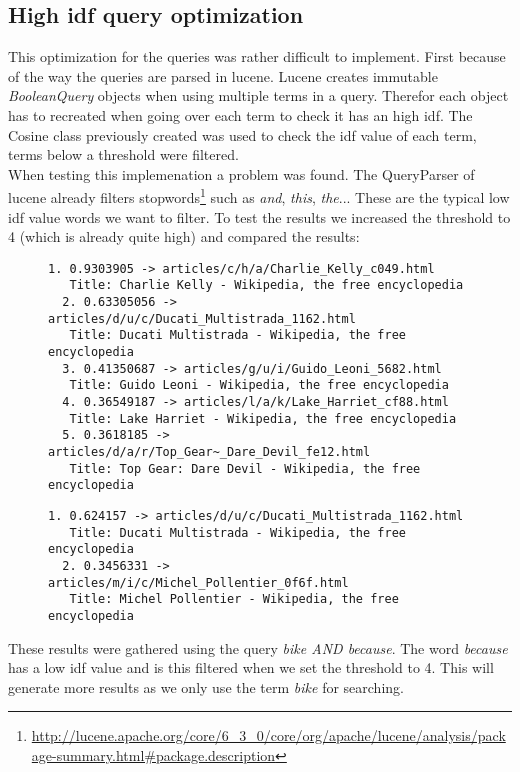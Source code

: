 \documentclass{article}
\begin{document}
\subsection{High idf query optimization}
This optimization for the queries was rather difficult to implement. First because of the way the queries are parsed in lucene. Lucene creates immutable \emph{BooleanQuery} objects when using multiple terms in a query. Therefor each object has to recreated when going over each term to check it has an high idf. The Cosine class previously created was used to check the idf value of each term, terms below a threshold were filtered.\\
When testing this implemenation a problem was found. The QueryParser of lucene already filters stopwords\footnote{\url{http://lucene.apache.org/core/6_3_0/core/org/apache/lucene/analysis/package-summary.html#package.description}} such as \emph{and}, \emph{this}, \emph{the}... These are the typical low idf value words we want to filter. To test the results we increased the threshold to 4 (which is already quite high) and compared the results:\\
\begin{figure}[H]
	\begin{minipage}{0.5\textwidth}
		\centering
		\begin{lstlisting}[basicstyle=\tiny\ttfamily, caption={High threshold}]
  1. 0.9303905 -> articles/c/h/a/Charlie_Kelly_c049.html
   Title: Charlie Kelly - Wikipedia, the free encyclopedia
  2. 0.63305056 -> articles/d/u/c/Ducati_Multistrada_1162.html
   Title: Ducati Multistrada - Wikipedia, the free encyclopedia
  3. 0.41350687 -> articles/g/u/i/Guido_Leoni_5682.html
   Title: Guido Leoni - Wikipedia, the free encyclopedia
  4. 0.36549187 -> articles/l/a/k/Lake_Harriet_cf88.html
   Title: Lake Harriet - Wikipedia, the free encyclopedia
  5. 0.3618185 -> articles/d/a/r/Top_Gear~_Dare_Devil_fe12.html
   Title: Top Gear: Dare Devil - Wikipedia, the free encyclopedia
		\end{lstlisting}
	\end{minipage}
	\begin{minipage}{0.5\textwidth}
		\centering
		\begin{lstlisting}[basicstyle=\tiny\ttfamily, caption={Low threshold},belowskip=7 \baselineskip]
  1. 0.624157 -> articles/d/u/c/Ducati_Multistrada_1162.html
   Title: Ducati Multistrada - Wikipedia, the free encyclopedia
  2. 0.3456331 -> articles/m/i/c/Michel_Pollentier_0f6f.html
   Title: Michel Pollentier - Wikipedia, the free encyclopedia

		\end{lstlisting}
	\end{minipage}
\end{figure}
These results were gathered using the query \emph{bike AND because}. The word \emph{because} has a low idf value and is this filtered when we set the threshold to 4. This will generate more results as we only use the term \emph{bike} for searching.
\end{document}
